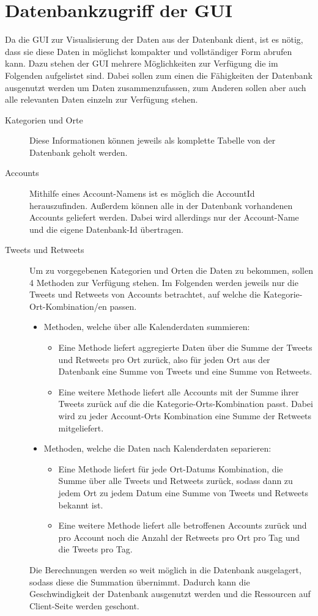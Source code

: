 \section{Datenbankzugriff der GUI}
Da die GUI zur Visualisierung der Daten aus der Datenbank dient, ist es nötig, dass sie diese Daten in möglichst kompakter und vollständiger Form abrufen kann. Dazu stehen der GUI mehrere Möglichkeiten zur Verfügung die im Folgenden aufgelistet sind. Dabei sollen zum einen die Fähigkeiten der Datenbank ausgenutzt werden um Daten zusammenzufassen, zum Anderen sollen aber auch alle relevanten Daten einzeln zur Verfügung stehen.\\

\begin{description}
\item[Kategorien und Orte] Diese Informationen können jeweils als komplette Tabelle von der Datenbank geholt werden.
\item[Accounts] Mithilfe eines Account-Namens ist es möglich die AccountId herauszufinden. Außerdem können alle in der Datenbank vorhandenen Accounts geliefert werden. Dabei wird allerdings nur der Account-Name und die eigene Datenbank-Id übertragen.
\item[Tweets und Retweets] Um zu vorgegebenen Kategorien und Orten die Daten zu bekommen, sollen 4 Methoden zur Verfügung stehen. Im Folgenden werden jeweils nur die Tweets und Retweets von Accounts betrachtet, auf welche die Kategorie-Ort-Kombination/en passen.

\begin{itemize}
	\item Methoden, welche über alle Kalenderdaten summieren:
	\begin{itemize}
		\item Eine Methode liefert aggregierte Daten über die Summe der Tweets und Retweets pro Ort zurück, also für jeden Ort aus der Datenbank eine Summe von Tweets und eine Summe von Retweets.
		\item Eine weitere Methode liefert alle Accounts mit der Summe ihrer Tweets zurück auf die die Kategorie-Orts-Kombination passt. Dabei wird zu jeder Account-Orts Kombination eine Summe der Retweets mitgeliefert.
	\end{itemize}
	\item Methoden, welche die Daten nach Kalenderdaten separieren:
	\begin{itemize}
		\item Eine Methode liefert für jede Ort-Datums Kombination, die Summe über alle Tweets und Retweets zurück, sodass dann zu jedem Ort zu jedem Datum eine Summe von Tweets und Retweets bekannt ist.
		\item Eine weitere Methode liefert alle betroffenen Accounts zurück und pro Account noch die Anzahl der Retweets pro Ort pro Tag und die Tweets pro Tag.
	\end{itemize}
\end{itemize}
Die Berechnungen werden so weit möglich in die Datenbank ausgelagert, sodass diese die Summation übernimmt. Dadurch kann die Geschwindigkeit der Datenbank ausgenutzt werden und die Ressourcen auf Client-Seite werden geschont.
\end{description}

